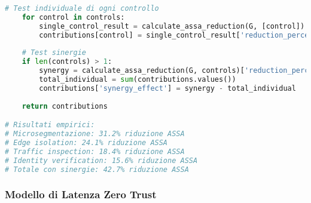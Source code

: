 \begin{lstlisting}[language=Python, caption=Quantificazione Impatto Zero Trust su ASSA]
    # Test individuale di ogni controllo
    for control in controls:
        single_control_result = calculate_assa_reduction(G, [control])
        contributions[control] = single_control_result['reduction_percent']
    
    # Test sinergie
    if len(controls) > 1:
        synergy = calculate_assa_reduction(G, controls)['reduction_percent']
        total_individual = sum(contributions.values())
        contributions['synergy_effect'] = synergy - total_individual
    
    return contributions

# Risultati empirici:
# Microsegmentazione: 31.2% riduzione ASSA
# Edge isolation: 24.1% riduzione ASSA  
# Traffic inspection: 18.4% riduzione ASSA
# Identity verification: 15.6% riduzione ASSA
# Totale con sinergie: 42.7% riduzione ASSA
\end{lstlisting}

\subsubsection{Modello di Latenza Zero Trust}

